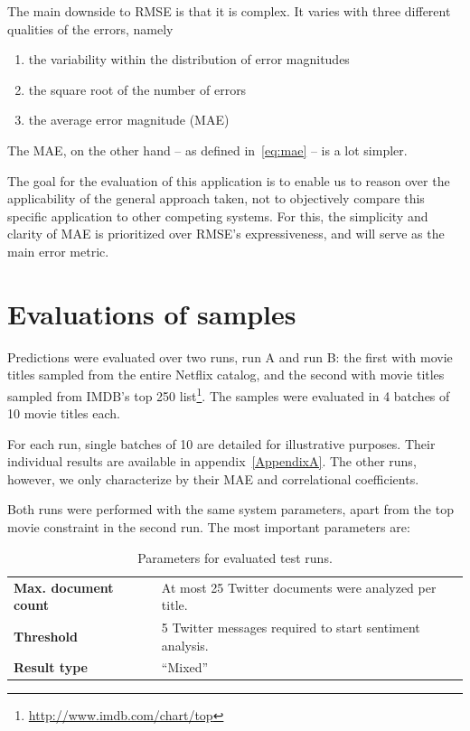 The main downside to RMSE is that it is complex. It varies with three different qualities of the errors, namely

\begin{enumerate}
  \item the variability within the distribution of error magnitudes
  \item the square root of the number of errors
  \item the average error magnitude (MAE)
\end{enumerate}

The MAE, on the other hand -- as defined in~\eqref{eq:mae} -- is a lot simpler.

The goal for the evaluation of this application is to enable us to reason over the applicability of the general approach taken, not to objectively compare this specific application to other competing systems. For this, the simplicity and clarity of MAE is prioritized over RMSE's expressiveness, and will serve as the main error metric.

\section{Evaluations of samples} %
\label{sec:eval_of_samples}

Predictions were evaluated over two runs, run A and run B: the first with movie titles sampled from the entire Netflix catalog, and the second with movie titles sampled from IMDB's top 250 list\footnote{\url{http://www.imdb.com/chart/top}}. The samples were evaluated in 4 batches of 10 movie titles each.

For each run, single batches of 10 are detailed for illustrative purposes. Their individual results are available in appendix~\ref{AppendixA}. The other runs, however, we only characterize by their MAE and correlational coefficients.

Both runs were performed with the same system parameters, apart from the top movie constraint in the second run. The most important parameters are:

\begin{table}[h!]
  \begin{center}
    \begin{tabular}{ll}
      \textbf{Max. document count} & At most 25 Twitter documents were analyzed per title. \\
      \textbf{Threshold}           & 5 Twitter messages required to start sentiment analysis. \\
      \textbf{Result type}         & ``Mixed'' \\
    \end{tabular}
  \end{center}
  \caption{Parameters for evaluated test runs.}
  \label{tab:run_parameters}
\end{table}

